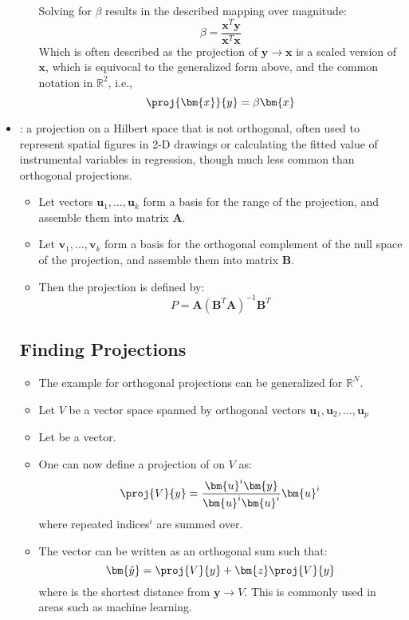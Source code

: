 \begin{itemize}
\begin{itemize}
      Solving for \(\beta \) results in the described mapping over magnitude:
      \[%
      \beta = \frac{\bm{x}^T \bm{y}}{\bm{x}^T \bm{x}}
      \]%
      Which is often described as the projection of \(\bm{y} \to \bm{x}\) is a scaled version of \(\bm{x}\), which is equivocal to the generalized form above, and the common notation in \(\mathbb{R}^2\), i.e.,
      \[%
      \proj{\bm{x}}{y} = \beta \bm{x}
      \]%
    \end{itemize}
  \item {}: a projection on a Hilbert space that is not orthogonal, often used to represent spatial figures in 2-D drawings or calculating the fitted value of instrumental variables in regression, though much less common than orthogonal projections. 
    \begin{itemize}
      \item Let vectors \(\bm{u}_1,\ldots,\bm{u}_k\) form a basis for the range of the projection, and assemble them into matrix \(\bm{A}\). 
      \item Let \(\bm{v}_1,\ldots,\bm{v}_k\) form a basis for the orthogonal complement of the null space of the projection, and assemble them into matrix \(\bm{B}\).
      \item Then the projection is defined by:
      \[%
      P = \bm{A}(\bm{B}^T \bm{A})^{-1} \bm{B}^T
      \]%
    \end{itemize}
  
  \subsection{Finding Projections}\label{}
  \begin{itemize}
    \item The example for orthogonal projections can be generalized for \(\mathbb{R}^N\). 
    \item Let \(V\) be a vector space spanned by orthogonal vectors \(\bm{u}_1,\bm{u}_2,\ldots,\bm{u}_p\)
    \item Let  be a vector.
    \item One can now define a projection of  on \(V\) as:
    \[%
    \proj{V}{y}=\frac{\bm{u}^i \bm{y}}{\bm{u}^i \bm{u}^i} \bm{u}^i
    \]%
    where repeated indices\(^i\) are summed over.
    \item The vector  can be written as an orthogonal sum such that:
    \[%
    \bm{\hat{y}} = \proj{V}{y} + \bm{z} \proj{V}{y}
    \]%
    where  is the shortest distance from \(\bm{y} \to V\). This is commonly used in areas such as machine learning.
  \end{itemize}
  
\end{itemize}



